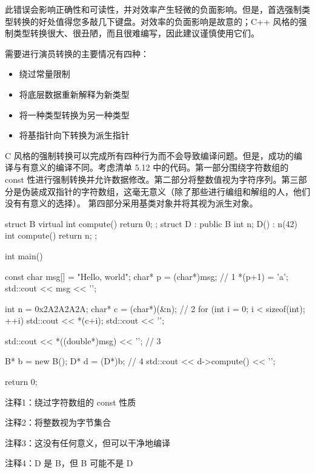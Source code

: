 此错误会影响正确性和可读性，并对效率产生轻微的负面影响。但是，首选强制类型转换的好处值得您多敲几下键盘。对效率的负面影响是故意的；C++ 风格的强制类型转换很大、很丑陋，而且很难编写，因此建议谨慎使用它们。


需要进行演员转换的主要情况有四种：

\begin{itemize}
\item
绕过常量限制

\item
将底层数据重新解释为新类型

\item
将一种类型转换为另一种类型

\item
将基指针向下转换为派生指针
\end{itemize}

C 风格的强制转换可以完成所有四种行为而不会导致编译问题。但是，成功的编译与有意义的编译不同。考虑清单 5.12 中的代码。第一部分围绕字符数组的 const 性进行强制转换并允许数据修改。第二部分将整数值视为字符序列。第三部分是伪装成双指针的字符数组，这毫无意义（除了那些进行编组和解组的人，他们没有有意义的选择）。
第四部分采用基类对象并将其视为派生对象。


\begin{cpp}
struct B {
  virtual int compute() { return 0; }
};
struct D : public B {
  int n;
  D() : n(42) {}
  int compute() { return n; }
};

int main() {
  const char msg[] = "Hello, world";
  char* p = (char*)msg; // 1
  *(p+1) = 'a';
  std::cout << msg << '\n';

  int n = 0x2A2A2A2A;
  char* c = (char*)(&n); // 2
  for (int i = 0; i < sizeof(int); ++i)
    std::cout << *(c+i);
  std::cout << '\n';

  std::cout << *((double*)msg) << '\n'; // 3

  B* b = new B();
  D* d = (D*)b; // 4
  std::cout << d->compute() << '\n';

  return 0;
}
\end{cpp}

{\footnotesize
注释1：绕过字符数组的 const 性质

注释2：将整数视为字节集合

注释3：这没有任何意义，但可以干净地编译

注释4：D 是 B，但 B 可能不是 D
}

